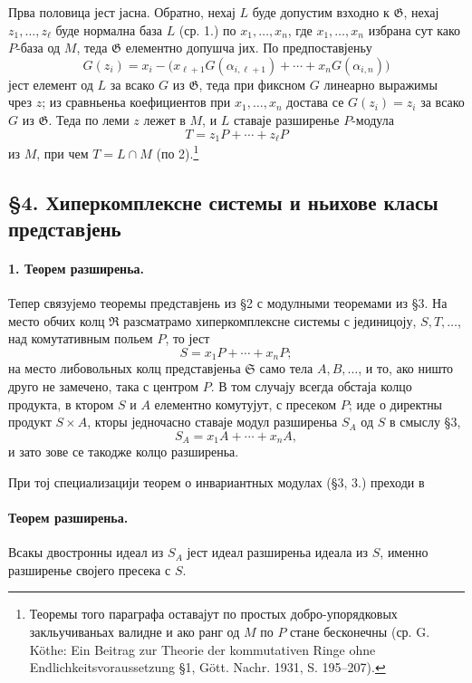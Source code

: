 ﻿\documentclass[11pt]{article}
\newcommand{\foreign}[1]{#1}
\providecommand{\frG}{\mathfrak G}
\providecommand{\frR}{\mathfrak R}
\providecommand{\frS}{\mathfrak S}
\begin{document}
Прва половица јест јасна. Обратно, нехај \(L\) буде допустим взходно к \(\frG\), нехај \(z_1,\ldots,z_\ell\) буде нормална база \(L\) (ср. 1.) по \(x_1,\ldots,x_n\), где \(x_1,\ldots,x_n\) избрана сут како \(P\)-база од \(M\), теда \(\frG\) елементно допушча јих. По предпоставјеньу
\[
        G(z_i)=x_i-\bigl(x_{\ell+1}G(\alpha_{i,\ell+1})
              +\cdots+x_nG(\alpha_{i,n})\bigr)
\]
јест елемент од \(L\) за всако \(G\) из \(\frG\), теда при фиксном \(G\) линеарно выражимы чрез \(z\); из сравньеньа коефициентов при \(x_1,\ldots,x_n\) достава се \(G(z_i)=z_i\) за всако \(G\) из \(\frG\). Теда по леми \(z\) лежет в \(M\), и \(L\) ставаје разширенье \(P\)-модула
\[
        T=z_1P+\cdots+z_\ell P
\]
из \(M\), при чем \(T=L\cap M\) (по 2).\footnote{Теоремы того параграфа оставајут по простых добро-упорядковых закльучиваньах валидне и ако ранг од \(M\) по \(P\) стане бесконечны (ср. G. Köthe: \foreign{Ein Beitrag zur Theorie der kommutativen Ringe ohne Endlichkeitsvoraussetzung} §1, Gött. Nachr. 1931, S. 195--207).}

\subsection*{§4. Хиперкомплексне системы и ньихове класы представјень}

\paragraph{1. Теорем разширеньа.}
Тепер связујемо теоремы представјень из §2 с модулными теоремами из §3. На место обчих колц \(\frR\) разсматрамо хиперкомплексне системы с јединицоју, \(S,T,\ldots\), над комутативным польем \(P\), то јест
\[
        S=x_1P+\cdots+x_nP;
\]
на место либовольных колц представјеньа \(\frS\) само тела \(A,B,\ldots\), и то, ако ништо друго не замечено, така с центром \(P\). В том случају всегда обстаја колцо продукта, в ктором \(S\) и \(A\) елементно комутујут, с пресеком \(P\); иде о директны продукт \(S\times A\), кторы једночасно ставаје модул разширеньа \(S_A\) од \(S\) в смыслу §3,
\[
        S_A=x_1A+\cdots+x_nA,
\]
и зато зове се такодже колцо разширеньа.

При тој специализацији теорем о инвариантных модулах (§3, 3.) преходи в

\paragraph{Теорем разширеньа.}
Всакы двостронны идеал из \(S_A\) јест идеал разширеньа идеала из \(S\), именно разширенье својего пресека с \(S\).
\end{document}
